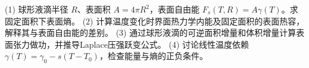 (1) 球形液滴半径 \(R\)、表面积 \(A=4\pi R^2\)，表面自由能 \(F_s(T,R)=A\gamma(T)\)。求固定面积下表面熵。
(2) 计算温度变化时界面热力学内能及固定面积的表面热容，解释其与表面自由能的差别。
(3) 通过球形液滴的可逆面积增量和体积增量计算表面张力做功，并推导Laplace压强跃变公式。
(4) 讨论线性温度依赖 \(\gamma(T)=\gamma_0-s(T-T_0)\)，检查能量与熵的正负条件。
